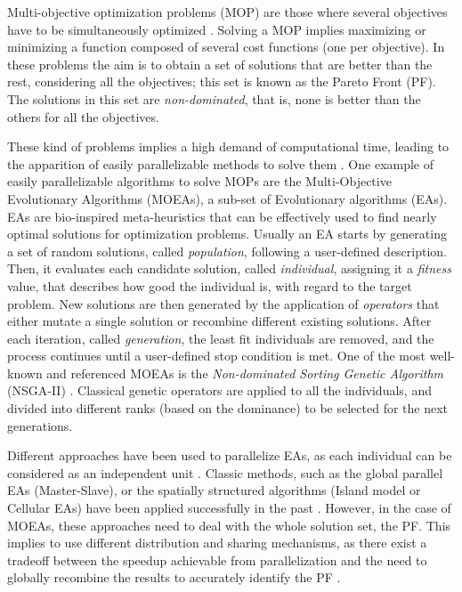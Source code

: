 \documentclass[preprint]{elsarticle}
\begin{document}
Multi-objective optimization problems (MOP) are those where several
objectives have to be simultaneously optimized
\citep{Mora13paretobased,LIU2017344}. Solving a MOP implies maximizing or minimizing
a function composed of several cost functions (one per objective). In
these problems the aim is to obtain a set of solutions that are better
than the rest, considering all the objectives; this set is known as
the Pareto Front (PF). The solutions in this set are {\em non-dominated},
that is, none is better than the others for all the objectives.


These kind of problems implies a high demand of computational time, leading to the apparition of easily parallelizable methods to solve them \citep{Luna15Survey,Mukhopadhyay14Survey,Chavez15MO,Hidalgo16residualstress,KAUR2018183,XU2018268}.
One example of easily parallelizable algorithms to solve MOPs are the Multi-Objective Evolutionary Algorithms (MOEAs), a sub-set of Evolutionary algorithms (EAs). EAs \citep{DBLP:series/ncs/EibenS15} are bio-inspired meta-heuristics that can be effectively used to find nearly optimal solutions for optimization problems. Usually an EA starts by generating a set of random solutions, called \emph{population}, following a user-defined description. Then, it evaluates each candidate solution, called \emph{individual}, assigning it a \emph{fitness} value, that describes how good the individual is, with regard to the target problem. New solutions are then generated by the application of \emph{operators} that either mutate a single solution or recombine different existing solutions. After each iteration, called \emph{generation}, the least fit individuals are removed, and the process continues until a user-defined stop condition is met. One of the most well-known and referenced MOEAs \citep{Dorronsoro13superlinear} is the {\em
  Non-dominated Sorting Genetic Algorithm} (NSGA-II)
\citep{Deb00NSGAII}. Classical genetic operators are applied to all
the individuals, and divided into different ranks (based on the
dominance) to be selected for the next generations. 


Different approaches have been used to parallelize EAs, as each individual can be considered as an
independent unit \citep{Alba13parallel}. Classic methods, such as the
global parallel EAs (Master-Slave), or the spatially structured
algorithms (Island model or Cellular EAs) have been applied
successfully in the past \citep{Folino03cellular,Alba02Parallelism}.
However, in the case of MOEAs, these
approaches \citep{Luna15Survey} need to deal with the whole solution set, the PF.
 This implies to use different distribution
and sharing mechanisms, as there exist a tradeoff between the speedup
achievable from parallelization and the need to globally recombine the
results to accurately identify the PF
\citep{Branke04Parallelizingcone}. 
\end{document}
